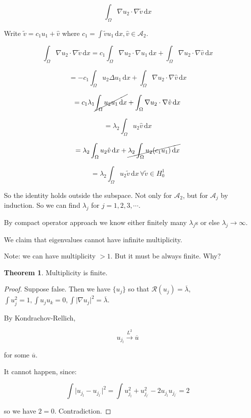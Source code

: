 \documentclass{article}
\theoremstyle{definition}
\newtheorem{theorem}{Theorem}
\begin{document}
\[
    \int_{\Omega} \nabla u_2 \cdot \nabla \widetilde{v} \,\mathrm{d}x 
\]

Write \(\widetilde{v} = c_1 u_1 + \hat{v}\) where \(c_1 = \int \widetilde{v} u_1 \, \mathrm{d}x, \hat{v} \in \mathscr{A}_2\).


\[
    \int_{\Omega} \nabla u_2 \cdot \nabla \widetilde{v}  \,\mathrm{d}x = c_1 \int_{\Omega} \nabla u_2 \cdot \nabla u_1 \,\mathrm{d}x + \int_{\Omega} \nabla u_2 \cdot \nabla \hat{v} \,\mathrm{d}x 
\]

\[
    = - c_1 \int_{\Omega} u_2 \Delta u_1 \,\mathrm{d}x + \int_{\Omega} \nabla u_2 \cdot \nabla \hat{v} \,\mathrm{d}x 
\]

\[
    = c_1 \lambda_1 \cancel{\int_{\Omega} u_2 u_1 \,\mathrm{d}x} + \int_{\Omega} \nabla u_2 \cdot \nabla \hat{v} \,\mathrm{d}x 
\]

\[
    = \lambda_2 \int_{\Omega} u_2 \hat{v} \,\mathrm{d}x 
\]

\[
    = \lambda_2 \int_{\Omega} u_2 \hat{v} \,\mathrm{d}x + \cancel{\lambda_2 \int_{\Omega} u_2 (c_1 u_1) \,\mathrm{d}x }
\]

\[
    = \lambda_2 \int_{\Omega} u_2 \widetilde{v} \,\mathrm{d}x \, \forall \widetilde{v} \in H^1_0
\]

So the identity holds outside the subspace. Not only for \(\mathscr{A}_2\), but for \(\mathscr{A}_j\) by induction. So we can find \(\lambda_j\) for \(j = 1, 2, 3, \cdots\).

By compact operator approach we know either finitely many \(\lambda_j\)s or else \(\lambda_j \to \infty\).

We claim that eigenvalues cannot have infinite multiplicity.

Note: we can have multiplicity \(> 1\). But it must be always finite. Why?

\begin{theorem}
    Multiplicity is finite.
\end{theorem}

\begin{proof}
    Suppose false. Then we have \(\{ u_j \} \) so that \(\mathcal{R} (u_j) = \overline{\lambda}\), \(\int u_j^2 = 1, \int u_j u_k = 0, \int \vert \nabla u_j \vert ^ 2 = \overline{\lambda}\).

    By Kondrachov-Rellich,

    \[
        u_{j_l} \overset{L^2}{\to} \overline{u}  
    \]

    for some \(\overline{u}\).

    It cannot happen, since:

    \[
        \int \vert u_{j_l} - u_{j_{l^{\prime}}} \vert ^2 = \int u_{j_l} ^2 + u_{j_{l^{\prime}}} ^2 - 2 u_{j_l} u_{j_{l^{\prime}}} = 2
    \]

    so we have \(2 = 0\). Contradiction.

\end{proof}
\end{document}
